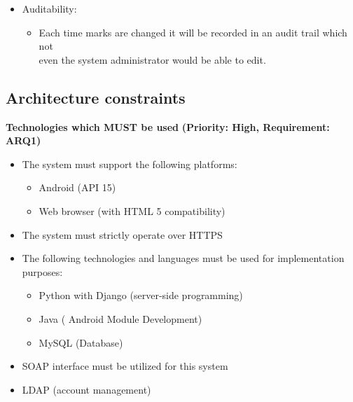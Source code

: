 \documentclass[12pt]{article}
\begin{document}
\begin{itemize}
				
		\item Auditability:
				\begin{itemize}
				\item Each time marks are changed it will be recorded in an audit trail which not\\
				even the system administrator would be able to edit.
				\end{itemize}
				
	\end{itemize}
			
	\vspace{0.2in}
			
	\subsection{Architecture constraints}
	
		\vspace{0.2in}
		
		\begin{flushleft}
			\textbf{Technologies which MUST be used}
			\newline\textbf{(Priority: High, Requirement: ARQ1)}
		\end{flushleft}
			
		\vspace{0.05in}
		\begin{itemize}
			\item The system must support the following platforms: 
			\begin{itemize}
				\item Android (API 15)
				\item Web browser (with HTML 5 compatibility)
			\end{itemize}
				
			\item The system must strictly operate over HTTPS
			\item The following technologies and languages must be used for implementation purposes:
			\begin{itemize}
				\item Python with Django (server-side programming)
				\item Java ( Android Module Development)
				\item MySQL (Database)
			\end{itemize}
			\item SOAP interface must be utilized for this system
			\item LDAP (account management)
		\end{itemize}
		
\end{document}
